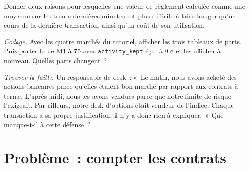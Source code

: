 \begin{exercise}[$\star\star$]\label{exo:m1:options-markets-europe-asia:6}
Donner deux raisons pour lesquelles une valeur de règlement calculée comme une moyenne sur les
trente dernières minutes est plus difficile à faire bouger qu'un cours de la dernière transaction, ainsi qu'un coût
de son utilisation.
\end{exercise}

\begin{exercise}[$\star\star\star$]\label{exo:m1:options-markets-europe-asia:7}
\emph{Codage.} Avec les quatre marchés du tutoriel, afficher les trois tableaux
de parts. Puis porter la  de M1 à 75 avec \texttt{activity\_kept} égal à 0.8 et
les afficher à nouveau. Quelles parts changent~?
\end{exercise}

\begin{exercise}[$\star\star\star$]\label{exo:m1:options-markets-europe-asia:8}
\emph{Trouver la faille.} Un responsable de desk~: «~Le matin, nous avons acheté des actions bancaires
parce qu'elles étaient bon marché par rapport aux contrats à terme. L'après-midi, nous les avons vendues
parce que notre limite de risque l'exigeait. Par ailleurs, notre desk d'options était vendeur de l'indice.
Chaque transaction a sa propre justification, il n'y a donc rien à expliquer.~» Que
manque-t-il à cette défense~?
\end{exercise}

\section{Problème~: compter les contrats}


